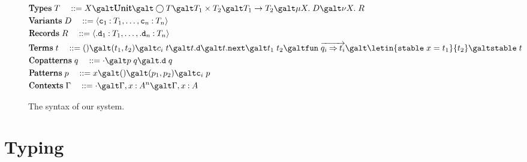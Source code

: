 \documentclass[acmsmall, natbib=false]{acmart}
\newcommand{\fun}{\mathtt{fun}}
\renewcommand{\circle}{\bigcirc}
\renewcommand{\next}{\mathtt{.next}}
\newcommand{\stable}{\mathtt{stable}}
\newcommand{\ctor}{\mathtt{c}}
\newcommand{\obs}{\mathtt{.d}}
\newcommand{\eq}{\quad::=}
\newcommand{\syn}[1]{\mathqd{#1}\;}
\begin{document}
\begin{figure}[ht]
  \begin{align*}
    & \syn{Types} T
      \eq X \galt \mathqd{Unit} \galt \circle T
      \galt T_1 \times T_2 \galt T_1 \to T_2
      \galt \mu X.\; D \galt \nu X.\; R
      \\
    & \syn{Variants} D
      \eq \langle \ctor_1 \hastype T_1, \ldots, \ctor_n \hastype T_n \rangle
      \\
    & \syn{Records} R
      \eq \langle \obs_1 \hastype T_1, \ldots, \obs_n \hastype T_n \rangle
      \\
    & \syn{Terms} t
      \eq () \galt (t_1, t_2) \galt c_i\; t \galt t\obs \galt t\next
      \galt t_1\; t_2 \galt \fun\; \overrightarrow{q_i \goesto t_i}
      \galt \letin{\stable\; x = t_1}{t_2} \galt \stable\; t
      \\
    & \syn{Copatterns} q
      \eq \cdot \galt p\; q \galt \obs\; q
      \\
    & \syn{Patterns} p
      \eq x \galt () \galt (p_1, p_2) \galt \ctor_i\; p
      \\
    & \syn{Contexts} \Gamma
      \eq \cdot \galt \Gamma, x \hastype A^n \galt \Gamma, x \hastype A
  \end{align*}
  \caption{%
    The syntax of our system.%
  }
  \label{fig:syntax}
\end{figure}

\section{Typing}
\label{sec:types}
\end{document}
